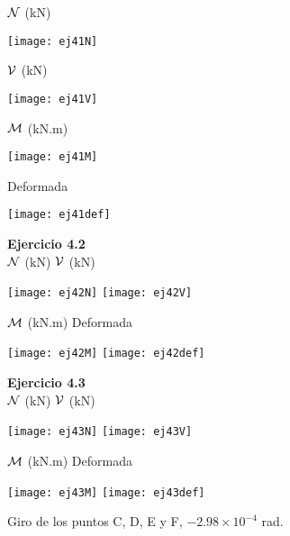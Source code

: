 ${\mathcal N}$ (kN)
\begin{center}
	\texttt{[image: ej41N]}
\end{center}


${\mathcal V}$ (kN)
\begin{center}
	\texttt{[image: ej41V]}
\end{center}
\clearpage
${\mathcal M}$ (kN.m)
\begin{center}
	\texttt{[image: ej41M]}
\end{center}


Deformada
\begin{center}
	\texttt{[image: ej41def]}
\end{center}


\clearpage
\textbf{Ejercicio 4.2}\\

\qquad \qquad
${\mathcal N}$ (kN) \hspace{0.5\textwidth} ${\mathcal V}$ (kN)
\begin{center}
	\texttt{[image: ej42N]}
	\texttt{[image: ej42V]}
\end{center}

\qquad \qquad
${\mathcal M}$ (kN.m)  \hspace{0.5\textwidth} Deformada
\begin{center}
	\texttt{[image: ej42M]}
	\texttt{[image: ej42def]}
\end{center}


\textbf{Ejercicio 4.3}\\

${\mathcal N}$ (kN) \hspace{0.4\textwidth} ${\mathcal V}$ (kN)
\begin{center}
	\texttt{[image: ej43N]}
	\texttt{[image: ej43V]}
\end{center}

${\mathcal M}$ (kN.m) \hspace{0.4\textwidth} Deformada
\begin{center}
	\texttt{[image: ej43M]}
	\texttt{[image: ej43def]}
\end{center}


Giro de los puntos C, D, E y F, $-2.98 \times 10^{-4}$ rad.\newline


